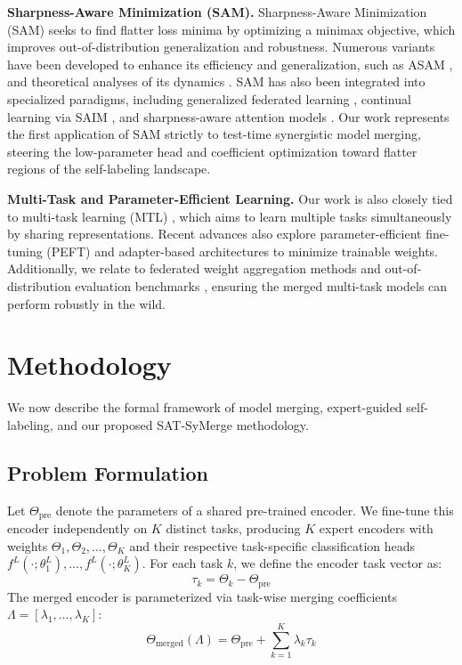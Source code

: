 \documentclass{article}
\begin{document}
\textbf{Sharpness-Aware Minimization (SAM).}
Sharpness-Aware Minimization (SAM) \cite{foret2021sharpness, foret2020sharpnessaware} seeks to find flatter loss minima by optimizing a minimax objective, which improves out-of-distribution generalization and robustness. Numerous variants have been developed to enhance its efficiency and generalization, such as ASAM \cite{kwon2021asam}, and theoretical analyses of its dynamics \cite{andriushchenko2022towards, du2021efficient, liu2022towards}. SAM has also been integrated into specialized paradigms, including generalized federated learning \cite{qu2022generalized}, continual learning via SAIM \cite{marczak2025saim}, and sharpness-aware attention models \cite{oikonomou2025sharpnessaware, li2025focalsam}. Our work represents the first application of SAM strictly to test-time synergistic model merging, steering the low-parameter head and coefficient optimization toward flatter regions of the self-labeling landscape.

\textbf{Multi-Task and Parameter-Efficient Learning.}
Our work is also closely tied to multi-task learning (MTL) \cite{caruana1997multitask, collobert2008unified, zhao2024multitask, hemalatha2024multitask}, which aims to learn multiple tasks simultaneously by sharing representations. Recent advances also explore parameter-efficient fine-tuning (PEFT) and adapter-based architectures \cite{chronopoulou2023adaptersoup, boudiaf2022parameterfree, wu2025unlocking} to minimize trainable weights. Additionally, we relate to federated weight aggregation methods \cite{liu2025fedswa, sun2025cat, zhang2025multisource} and out-of-distribution evaluation benchmarks \cite{hendrycks2019benchmarking, hendrycks2020measuring}, ensuring the merged multi-task models can perform robustly in the wild.

\section{Methodology}
\label{sec:method}

We now describe the formal framework of model merging, expert-guided self-labeling, and our proposed SAT-SyMerge methodology.

\subsection{Problem Formulation}
Let $\Theta_{\text{pre}}$ denote the parameters of a shared pre-trained encoder. We fine-tune this encoder independently on $K$ distinct tasks, producing $K$ expert encoders with weights $\Theta_1, \Theta_2, \dots, \Theta_K$ and their respective task-specific classification heads $f^L(\cdot; \theta_1^L), \dots, f^L(\cdot; \theta_K^L)$. For each task $k$, we define the encoder task vector as:
\begin{equation}
    \tau_k = \Theta_k - \Theta_{\text{pre}}
\end{equation}
The merged encoder is parameterized via task-wise merging coefficients $\Lambda = [\lambda_1, \dots, \lambda_K]$:
\begin{equation}
    \Theta_{\text{merged}}(\Lambda) = \Theta_{\text{pre}} + \sum_{k=1}^K \lambda_k \tau_k
\end{equation}
\end{document}
